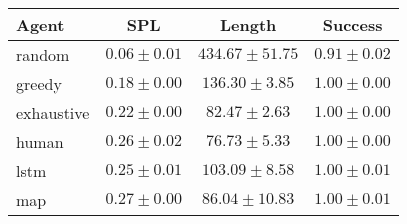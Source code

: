 \begin{tabular}{lccc}
    \toprule
    Agent & SPL & Length & Success \\
    \midrule
    random & $0.06 \pm 0.01$ & $434.67 \pm 51.75$ & $0.91 \pm 0.02$\\
    greedy & $0.18 \pm 0.00$ & $136.30 \pm 3.85$ & $1.00 \pm 0.00$\\
    exhaustive & $0.22 \pm 0.00$ & $82.47 \pm 2.63$ & $1.00 \pm 0.00$\\
    human & $0.26 \pm 0.02$ & $76.73 \pm 5.33$ & $1.00 \pm 0.00$\\
    lstm & $0.25 \pm 0.01$ & $103.09 \pm 8.58$ & $1.00 \pm 0.01$\\
    map & $0.27 \pm 0.00$ & $86.04 \pm 10.83$ & $1.00 \pm 0.01$\\
    \bottomrule
\end{tabular}